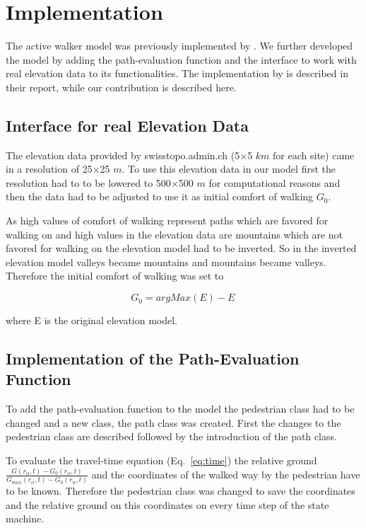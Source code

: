 \section{Implementation}

The active walker model was previously implemented by \citet{trailsystems}. We further developed the model by adding the path-evaluation function and the interface to work with real elevation data to its functionalities. The implementation by \citet{trailsystems} is described in their report, while our contribution is described here.

\subsection{Interface for real Elevation Data}

The elevation data provided by swisstopo.admin.ch (5$\times$5 $km$ for each site) came in a resolution of 25$\times$25 $m$. To use this elevation data in our model first the resolution had to to be lowered to 500$\times$500 $m$ for computational reasons and then the data had to be adjusted to use it as initial comfort of walking $G_0$.

As high values of comfort of walking represent paths which are favored for walking on and high values in the elevation data are mountains which are not favored for walking on the elevation model had to be inverted. So in the inverted elevation model valleys became  mountains and mountains became valleys. Therefore the initial comfort of walking was set to

\begin{equation}
G_0 = argMax(E)-E \,
\end{equation}

where E is the original elevation model.

\subsection{Implementation of the Path-Evaluation Function}

To add the path-evaluation function to the model the pedestrian class had to be changed and a new class, the path class was created. First the changes to the pedestrian class are described followed by the introduction of the path class.

To evaluate the travel-time equation (Eq.\ \ref{eq:time}) the relative ground $\frac{G(r_{\alpha},t)-G_{0}(r_{\alpha},t)}{G_{max}(r_{\alpha},t)-G_{0}(r_{\alpha},t)}$ and the coordinates of the walked way by the pedestrian have to be known. Therefore the pedestrian class was changed to save the coordinates and the relative ground on this coordinates on every time step of the state machine.

